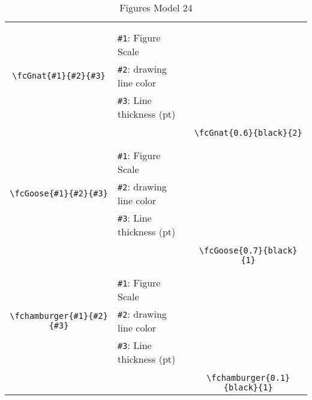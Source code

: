 \documentclass[x11names]{article}
\begin{document}
\begin{table}[H]
\begin{tabular}{|c|l|c|}
	&&\multirow{5}{*}{\fcGnat{0.6}{black}{2}}\\	&&\\	&\verb|#1|: Figure Scale &\\	\verb|\fcGnat{#1}{#2}{#3}|&	\verb|#2|: drawing line color &\\	&\verb|#3|: Line thickness (pt) &\\ &&\\&&	\verb|\fcGnat{0.6}{black}{2}|\\\hline 	
	&&\multirow{5}{*}{\fcGoose{0.7}{black}{1}}\\	&&\\	&\verb|#1|: Figure Scale &\\	\verb|\fcGoose{#1}{#2}{#3}|&	\verb|#2|: drawing line color &\\	&\verb|#3|: Line thickness (pt) &\\ &&\\&&	\verb|\fcGoose{0.7}{black}{1}|\\\hline 	
	&&\multirow{5}{*}{\fchamburger{0.1}{black}{1}}\\	&&\\	&\verb|#1|: Figure Scale &\\	\verb|\fchamburger{#1}{#2}{#3}|&	\verb|#2|: drawing line color &\\	&\verb|#3|: Line thickness (pt) &\\ &&\\&&	\verb|\fchamburger{0.1}{black}{1}|\\\hline 	\hline\end{tabular}\caption{Figures Model 24}\label{tab24}\end{table}
\end{document}
